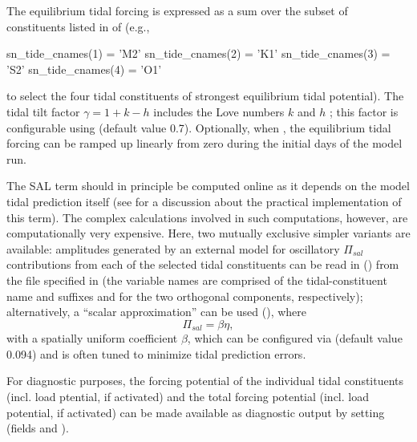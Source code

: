 \documentclass[../main/NEMO_manual]{subfiles}
\begin{document}
The equilibrium tidal forcing is expressed as a sum over the subset of
constituents listed in  of
 (e.g.,
\begin{forlines}
      sn_tide_cnames(1) = 'M2'
      sn_tide_cnames(2) = 'K1'
      sn_tide_cnames(3) = 'S2'
      sn_tide_cnames(4) = 'O1'
\end{forlines}
to select the four tidal constituents of strongest equilibrium tidal
potential). The tidal tilt factor $\gamma = 1 + k - h$ includes the
Love numbers $k$ and $h$ \citep{love_PRSL09}; this factor is
configurable using  (default value 0.7). Optionally,
when , the equilibrium tidal
forcing can be ramped up linearly from zero during the initial
 days of the model run.\par

The SAL term should in principle be computed online as it depends on
the model tidal prediction itself (see \citet{arbic.garner.ea_DSR04} for a
discussion about the practical implementation of this term). The complex
calculations involved in such computations, however, are computationally very
expensive. Here, two mutually exclusive simpler variants are available:
amplitudes generated by an external model for oscillatory $\Pi_{sal}$
contributions from each of the selected tidal constituents can be read in
() from the file specified in
 (the variable names are comprised of the
tidal-constituent name and suffixes  and  for the two
orthogonal components, respectively); alternatively, a ``scalar approximation''
can be used (), where
\[
  \Pi_{sal} = \beta \eta,
\]
with a spatially uniform coefficient $\beta$, which can be configured
via  (default value 0.094) and is
often tuned to minimize tidal prediction errors.\par

For diagnostic purposes, the forcing potential of the individual tidal
constituents (incl. load ptential, if activated) and the total forcing
potential (incl. load potential, if activated) can be made available
as diagnostic output by setting
 (fields
 and ).\par

\end{document}
